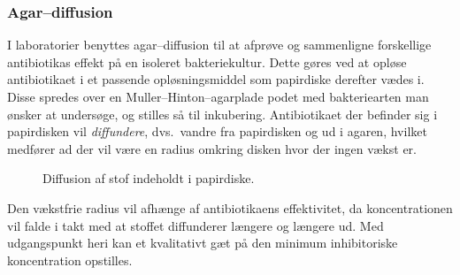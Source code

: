     \subsubsection{Agar--diffusion}
    I laboratorier benyttes agar--diffusion til at afprøve og sammenligne forskellige antibiotikas effekt på en isoleret bakteriekultur. Dette gøres ved at opløse antibiotikaet i et passende opløsningsmiddel som papirdiske derefter vædes i. Disse spredes over en Muller--Hinton--agarplade podet med bakteriearten man ønsker at undersøge, og stilles så til inkubering. Antibiotikaet der befinder sig i papirdisken vil \textit{diffundere}, dvs.\ vandre fra papirdisken og ud i agaren, hvilket medfører ad der vil være en radius omkring disken hvor der ingen vækst er.
    \begin{figure}[H]\centering
        \caption{Diffusion af stof indeholdt i papirdiske.}
    \end{figure}
    Den vækstfrie radius vil afhænge af antibiotikaens effektivitet, da koncentrationen vil falde i takt med at stoffet diffunderer længere og længere ud. Med udgangspunkt heri kan et kvalitativt gæt på den minimum inhibitoriske koncentration opstilles.
